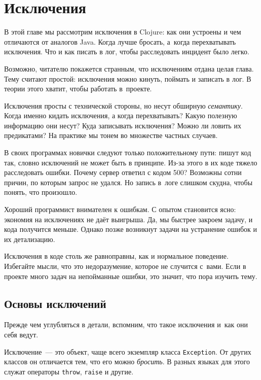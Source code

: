 \chapter{Исключения}


\begin{teaser}
В этой главе мы рассмотрим исключения в Clojure: как они устроены и чем
отличаются от аналогов Java. Когда лучше бросать, а~когда перехватывать
исключения. Что и как писать в лог, чтобы расследовать инцидент было легко.
\end{teaser}

Возможно, читателю покажется странным, что исключениям отдана целая глава. Тему
считают простой: исключения можно кинуть, поймать и записать в лог. В теории
этого хватит, чтобы работать в~проекте.

Исключения просты с технической стороны, но несут обширную
\emph{семантику}. Когда именно кидать исключения, а когда перехватывать?  Какую
полезную информацию они несут? Куда записывать исключения? Можно ли ловить их
предикатами? На практике мы тонем во множестве частных случаев.

В своих программах новички следуют только положительному пути: пишут код так,
словно исключений не может быть в принципе. Из-за этого в их коде тяжело
расследовать ошибки. Почему сервер ответил с кодом 500? Возможны сотни причин,
по которым запрос не удался. Но запись в~логе слишком скудна, чтобы понять, что
произошло.

Хороший программист внимателен к ошибкам. С опытом становится ясно: экономия на
исключениях не даёт выигрыша. Да, мы быстрее закроем задачу, и кода
получится меньше. Однако позже возникнут задачи на устранение ошибок и их
детализацию.

Исключения в коде столь же равноправны, как и нормальное поведение. Избегайте
мысли, что это недоразумение, которое не случится с~вами. Если в проекте много
задач на непойманные ошибки, это значит, что пора изучить тему.

\section{Основы исключений}


Прежде чем углубляться в детали, вспомним, что такое исключения и~как они себя
ведут.

Исключение~--- это объект, чаще всего экземпляр класса \verb|Exception|. От других
классов он отличается тем, что его можно \emph{бросить}. В разных языках для
этого служат операторы \verb|throw|, \verb|raise| и другие.

